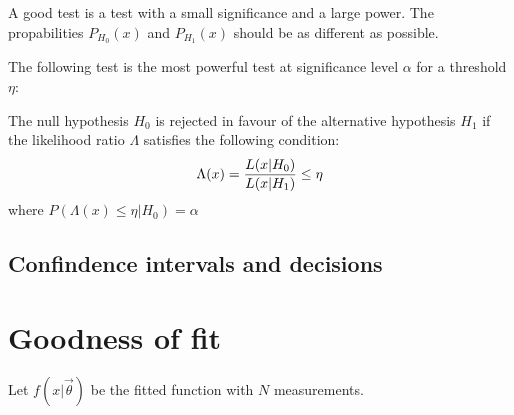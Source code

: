 {{	\begin{theorem}
    	A good test is a test with a small significance and a large power. The propabilities $P_{H_0}(x)$ and $P_{H_1}(x)$ should be as different as possible.
    \end{theorem}
    
    \begin{theorem}
    	The following test is the most powerful test at significance level $\alpha$ for a threshold $\eta$:
    	
        The null hypothesis $H_0$ is rejected in favour of the alternative hypothesis $H_1$ if the likelihood ratio $\Lambda$ satisfies the following condition: 
        \begin{equation}\index{likelihood!ratio}
			\label{statistics:likelihood_ratio}
            \Lambda(x) = \stylefrac{L(x|H_0)}{L(x|H_1)} \leq \eta
		\end{equation}
        where $P(\Lambda(x)\leq\eta|H_0) = \alpha $
    \end{theorem}
    
\subsection{Confindence intervals and decisions}

\section{Goodness of fit}
	Let $f(x|\vec{\theta})$ be the fitted function with $N$ measurements.
}}
